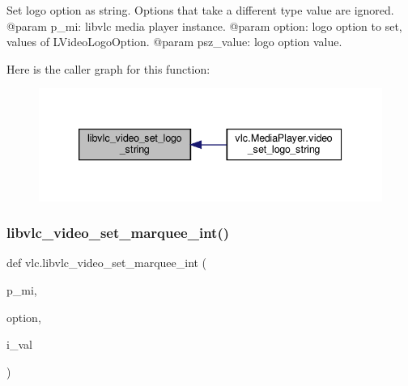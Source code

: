 \begin{DoxyVerb}Set logo option as string. Options that take a different type value
are ignored.
@param p_mi: libvlc media player instance.
@param option: logo option to set, values of L{VideoLogoOption}.
@param psz_value: logo option value.
\end{DoxyVerb}
 Here is the caller graph for this function\+:
\nopagebreak
\begin{figure}[H]
\begin{center}
\leavevmode
\includegraphics[width=339pt]{namespacevlc_a20561b3917572011df2fb28924f6160c_icgraph}
\end{center}
\end{figure}
\mbox{\label{namespacevlc_ae19a8b8caacacd5289023bee28ccff47}} 
\subsubsection{\texorpdfstring{libvlc\+\_\+video\+\_\+set\+\_\+marquee\+\_\+int()}{libvlc\_video\_set\_marquee\_int()}}
{\footnotesize\ttfamily def vlc.\+libvlc\+\_\+video\+\_\+set\+\_\+marquee\+\_\+int (\begin{DoxyParamCaption}\item[{}]{p\+\_\+mi,  }\item[{}]{option,  }\item[{}]{i\+\_\+val }\end{DoxyParamCaption})}

